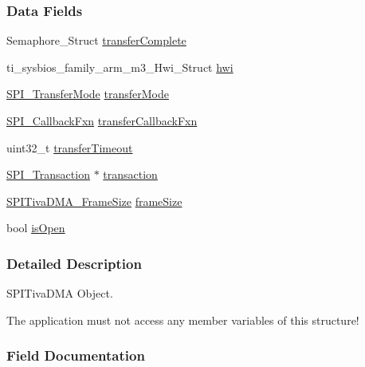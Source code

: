 \subsubsection*{Data Fields}
\begin{DoxyCompactItemize}
\item 
Semaphore\-\_\-\-Struct \hyperlink{struct_s_p_i_tiva_d_m_a___object_a063be770c053fb4643dfd09d4a10849e}{transfer\-Complete}
\item 
ti\-\_\-sysbios\-\_\-family\-\_\-arm\-\_\-m3\-\_\-\-Hwi\-\_\-\-Struct \hyperlink{struct_s_p_i_tiva_d_m_a___object_aabde395cde8a77c8a21152c70e9a4246}{hwi}
\item 
\hyperlink{_s_p_i_8h_ab9ea76c6529d6076eee5e1c4a5a92c6f}{S\-P\-I\-\_\-\-Transfer\-Mode} \hyperlink{struct_s_p_i_tiva_d_m_a___object_a6aaaff4b748edfe529783a1ad4fd0072}{transfer\-Mode}
\item 
\hyperlink{_s_p_i_8h_aeb03e7608a14021c3b0acf92c90e2168}{S\-P\-I\-\_\-\-Callback\-Fxn} \hyperlink{struct_s_p_i_tiva_d_m_a___object_a61bd80a8b3c333deed8f62f7b111446a}{transfer\-Callback\-Fxn}
\item 
uint32\-\_\-t \hyperlink{struct_s_p_i_tiva_d_m_a___object_a295de290a40e3521f20e2c9dd83bfc16}{transfer\-Timeout}
\item 
\hyperlink{struct_s_p_i___transaction}{S\-P\-I\-\_\-\-Transaction} $\ast$ \hyperlink{struct_s_p_i_tiva_d_m_a___object_a6cdc7c21c1b929e2a2f3956072bd444f}{transaction}
\item 
\hyperlink{_s_p_i_tiva_d_m_a_8h_a65cb55b42cf383ece69876f50ba2d0a4}{S\-P\-I\-Tiva\-D\-M\-A\-\_\-\-Frame\-Size} \hyperlink{struct_s_p_i_tiva_d_m_a___object_a3f59d2d7fe94828380dda940e0ccdcdd}{frame\-Size}
\item 
bool \hyperlink{struct_s_p_i_tiva_d_m_a___object_a6df49861408f17545708084630dfca22}{is\-Open}
\end{DoxyCompactItemize}


\subsubsection{Detailed Description}
S\-P\-I\-Tiva\-D\-M\-A Object. 

The application must not access any member variables of this structure! 

\subsubsection{Field Documentation}
